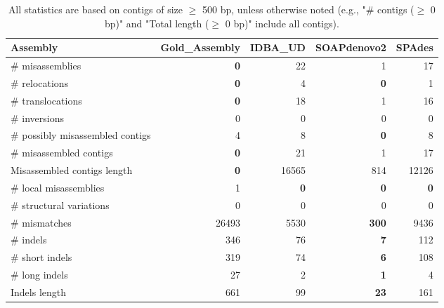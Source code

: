 \documentclass[12pt,a4paper]{article}
\begin{document}
\begin{table}[ht]
\begin{center}
\caption{All statistics are based on contigs of size $\geq$ 500 bp, unless otherwise noted (e.g., "\# contigs ($\geq$ 0 bp)" and "Total length ($\geq$ 0 bp)" include all contigs).}
\begin{tabular}{|l*{4}{|r}|}
\hline
Assembly & Gold\_Assembly & IDBA\_UD & SOAPdenovo2 & SPAdes \\ \hline
\# misassemblies & {\bf 0} & 22 & 1 & 17 \\ \hline
\hspace{5mm}\# relocations & {\bf 0} & 4 & {\bf 0} & 1 \\ \hline
\hspace{5mm}\# translocations & {\bf 0} & 18 & 1 & 16 \\ \hline
\hspace{5mm}\# inversions & 0 & 0 & 0 & 0 \\ \hline
\# possibly misassembled contigs & 4 & 8 & {\bf 0} & 8 \\ \hline
\# misassembled contigs & {\bf 0} & 21 & 1 & 17 \\ \hline
Misassembled contigs length & {\bf 0} & 16565 & 814 & 12126 \\ \hline
\# local misassemblies & 1 & {\bf 0} & {\bf 0} & {\bf 0} \\ \hline
\# structural variations & 0 & 0 & 0 & 0 \\ \hline
\# mismatches & 26493 & 5530 & {\bf 300} & 9436 \\ \hline
\# indels & 346 & 76 & {\bf 7} & 112 \\ \hline
\hspace{5mm}\# short indels & 319 & 74 & {\bf 6} & 108 \\ \hline
\hspace{5mm}\# long indels & 27 & 2 & {\bf 1} & 4 \\ \hline
Indels length & 661 & 99 & {\bf 23} & 161 \\ \hline
\end{tabular}
\end{center}
\end{table}
\end{document}
